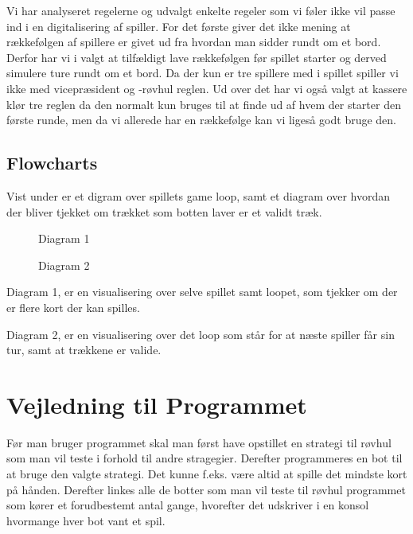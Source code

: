 \documentclass[a4paper, 12pt]{article}
\begin{document}
Vi har analyseret regelerne og udvalgt enkelte regeler som vi føler ikke vil passe ind i en digitalisering af spiller. For det første giver det ikke mening at rækkefølgen af spillere er givet ud fra hvordan man sidder rundt om et bord. Derfor har vi i valgt at tilfældigt lave rækkefølgen før spillet starter og derved simulere ture rundt om et bord. Da der kun er tre spillere med i spillet spiller vi ikke med vicepræsident og -røvhul reglen.
Ud over det har vi også valgt at kassere klør tre reglen da den normalt kun bruges til at finde ud af hvem der starter den første runde, men da vi allerede har en rækkefølge kan vi ligeså godt bruge den.

\vfill
\pagebreak

\subsection{Flowcharts}
Vist under er et digram over spillets game loop, samt et diagram over hvordan der bliver tjekket om trækket som botten laver er et validt træk.
\begin{figure}[H]
	\centering
	\resizebox{.5\linewidth}{!}{}
	\caption{Diagram 1}
\end{figure}

\begin{figure}[H]
	\centering
	\resizebox{.5\linewidth}{!}{}
	\caption{Diagram 2}
\end{figure}

Diagram 1, er en visualisering over selve spillet samt loopet, som tjekker om der er flere kort der kan spilles.
\bigbreak

Diagram 2, er en visualisering over det loop som står for at næste spiller får sin tur, samt at trækkene er valide.

\section{Vejledning til Programmet}

Før man bruger programmet skal man først have opstillet en strategi til røvhul som man vil teste i forhold til andre stragegier. Derefter programmeres en bot til at bruge den valgte strategi. Det kunne f.eks. være altid at spille det mindste kort på hånden. Derefter linkes alle de botter som man vil teste til røvhul programmet som kører et forudbestemt antal gange, hvorefter det udskriver i en konsol hvormange hver bot vant et spil.

\vfill
\pagebreak
\end{document}
